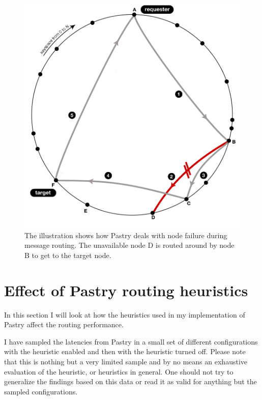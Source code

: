 \begin{figure}[!htb]
\begin{center}
  \includegraphics[width=0.9\linewidth]{illustrations/PastryRoutingFailed.png}
  \caption{The illustration shows how Pastry deals with node failure during message routing. The unavailable node D is routed around by node B to get to the target node.}
  \label{figurePastryFailedLookup}
\end{center}
\end{figure}


\section{Effect of Pastry routing heuristics}
In this section I will look at how the heuristics used in my implementation of Pastry affect the routing performance. 

I have sampled the latencies from Pastry in a small set of different configurations with the heuristic enabled and then with the heuristic turned off. Please note that this is nothing but a very limited sample and by no means an exhaustive evaluation of the heuristic, or heuristics in general. One should not try to generalize the findings based on this data or read it as valid for anything but the sampled configurations.

